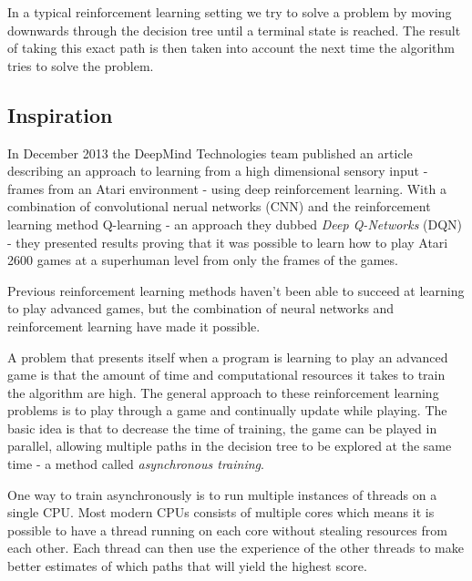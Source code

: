 \documentclass[11pt]{article}
\begin{document}
In a typical reinforcement learning setting we try to solve a problem
by moving downwards through the decision tree until a terminal state is reached.
The result of taking this exact path is then
taken into account the next time the algorithm tries to solve the problem.

\subsection{Inspiration}

In December 2013 the DeepMind Technologies team published an article
describing an approach to learning from a high dimensional sensory input -
frames from an Atari environment -
using deep reinforcement learning\cite{dqn}.
With a combination of convolutional nerual networks (CNN) and
the reinforcement learning method Q-learning\cite{RLbook} - an approach they
dubbed \textit{Deep Q-Networks} (DQN) - they
presented results proving that it was possible to learn how to play Atari
2600 games at a superhuman level from only the frames of the games.

Previous reinforcement learning methods haven't been able to succeed at learning to play
advanced games, but the combination of neural networks and
reinforcement learning have made it possible.

A problem that presents itself when a program is learning to play an advanced 
game is that the amount of time and computational resources it takes to train
the algorithm are high.
The general approach to these reinforcement learning problems is to
play through a game and continually update while playing.
The basic idea is that to decrease the time of training, the game can be
played in parallel,
allowing multiple paths in the decision tree to be explored at the same time -
a method called \textit{asynchronous training}.


One way to train asynchronously is to run multiple instances of threads on a single
CPU.
Most modern CPUs consists of multiple cores which means it is possible to have a thread
running on each core without stealing resources from each other.
Each thread can then use the experience of the other threads to make
better estimates of which paths that will yield the highest score.
\end{document}
